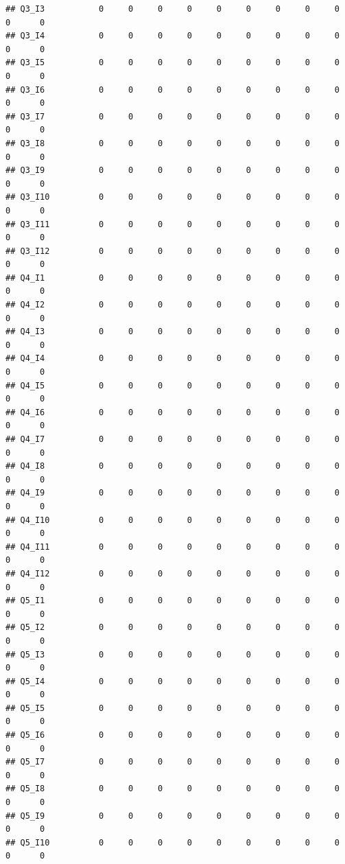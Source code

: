 \documentclass[
]{book}
\begin{document}
\begin{verbatim}
## Q3_I3           0     0     0     0     0     0     0     0     0     0      0
## Q3_I4           0     0     0     0     0     0     0     0     0     0      0
## Q3_I5           0     0     0     0     0     0     0     0     0     0      0
## Q3_I6           0     0     0     0     0     0     0     0     0     0      0
## Q3_I7           0     0     0     0     0     0     0     0     0     0      0
## Q3_I8           0     0     0     0     0     0     0     0     0     0      0
## Q3_I9           0     0     0     0     0     0     0     0     0     0      0
## Q3_I10          0     0     0     0     0     0     0     0     0     0      0
## Q3_I11          0     0     0     0     0     0     0     0     0     0      0
## Q3_I12          0     0     0     0     0     0     0     0     0     0      0
## Q4_I1           0     0     0     0     0     0     0     0     0     0      0
## Q4_I2           0     0     0     0     0     0     0     0     0     0      0
## Q4_I3           0     0     0     0     0     0     0     0     0     0      0
## Q4_I4           0     0     0     0     0     0     0     0     0     0      0
## Q4_I5           0     0     0     0     0     0     0     0     0     0      0
## Q4_I6           0     0     0     0     0     0     0     0     0     0      0
## Q4_I7           0     0     0     0     0     0     0     0     0     0      0
## Q4_I8           0     0     0     0     0     0     0     0     0     0      0
## Q4_I9           0     0     0     0     0     0     0     0     0     0      0
## Q4_I10          0     0     0     0     0     0     0     0     0     0      0
## Q4_I11          0     0     0     0     0     0     0     0     0     0      0
## Q4_I12          0     0     0     0     0     0     0     0     0     0      0
## Q5_I1           0     0     0     0     0     0     0     0     0     0      0
## Q5_I2           0     0     0     0     0     0     0     0     0     0      0
## Q5_I3           0     0     0     0     0     0     0     0     0     0      0
## Q5_I4           0     0     0     0     0     0     0     0     0     0      0
## Q5_I5           0     0     0     0     0     0     0     0     0     0      0
## Q5_I6           0     0     0     0     0     0     0     0     0     0      0
## Q5_I7           0     0     0     0     0     0     0     0     0     0      0
## Q5_I8           0     0     0     0     0     0     0     0     0     0      0
## Q5_I9           0     0     0     0     0     0     0     0     0     0      0
## Q5_I10          0     0     0     0     0     0     0     0     0     0      0

\end{verbatim}
\end{document}
